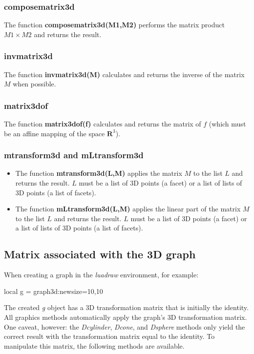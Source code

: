 \subsubsection{composematrix3d}
The function \textbf{composematrix3d(M1,M2)} performs the matrix product $M1\times M2$ and returns the result.

\subsubsection{invmatrix3d}
The function \textbf{invmatrix3d(M)} calculates and returns the inverse of the matrix $M$ when possible.

\subsubsection{matrix3dof}

The function \textbf{matrix3dof(f)} calculates and returns the matrix of $f$ (which must be an affine mapping of the space $\mathbf R^3$).

\subsubsection{mtransform3d and mLtransform3d}
\begin{itemize}
\item The function \textbf{mtransform3d(L,M)} applies the matrix $M$ to the list $L$ and returns the result. $L$ must be a list of 3D points (a facet) or a list of lists of 3D points (a list of facets).
\item The function \textbf{mLtransform3d(L,M)} applies the linear part of the matrix $M$ to the list $L$ and returns the result. $L$ must be a list of 3D points (a facet) or a list of lists of 3D points (a list of facets).
\end{itemize}

\subsection{Matrix associated with the 3D graph}

When creating a graph in the \emph{luadraw} environment, for example:
\begin{Luacode}
local g = graph3d:new{size={10,10}}
\end{Luacode}
The created \emph{g} object has a 3D transformation matrix that is initially the identity. All graphics methods automatically apply the graph's 3D transformation matrix. One caveat, however: the \emph{Dcylinder}, \emph{Dcone}, and \emph{Dsphere} methods only yield the correct result with the transformation matrix equal to the identity. To manipulate this matrix, the following methods are available.

